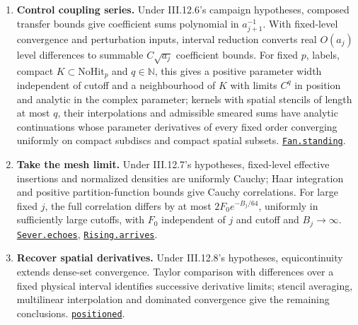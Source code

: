 \documentclass[
  letterpaper,
  11pt]{article}
\begin{document}
\begin{enumerate}
  place separated insertions in distinct cells with interior margins;
  offset comparison and the chessboard inequality bound products. Slot
  differences act on their insertions, giving III.12.1.
  \href{https://github.com/yang-mills-group/OpenAI-YM-20261028/blob/3456e5e75cf8d4cd558955a5c7638fba2d68f464/YM/FullVolume/Literal.lean\#L42-L61}{\texttt{funding}}.
\item
  \textbf{Control coupling series.} Under III.12.6's campaign
  hypotheses, composed transfer bounds give coefficient sums polynomial
  in \(a_{j+1}^{-1}\). With fixed-level convergence and perturbation
  inputs, interval reduction converts real \(O(a_j)\) level differences
  to summable \(C\sqrt{a_j}\) coefficient bounds. For fixed \(p\),
  labels, compact \(K\subset\mathrm{NoHit}_p\) and \(q\in\mathbb N\),
  this gives a positive parameter width independent of cutoff and a
  neighbourhood of \(K\) with limits \(C^q\) in position and analytic in
  the complex parameter; kernels with spatial stencils of length at most
  \(q\), their interpolations and admissible smeared sums have analytic
  continuations whose parameter derivatives of every fixed order
  converging uniformly on compact subdiscs and compact spatial subsets.
  \href{https://github.com/yang-mills-group/OpenAI-YM-20261028/blob/3456e5e75cf8d4cd558955a5c7638fba2d68f464/YM/FullVolume/Finale/Atlas.lean\#L94-L104}{\texttt{Fan.standing}}.
\item
  \textbf{Take the mesh limit.} Under III.12.7's hypotheses, fixed-level
  effective insertions and normalized densities are uniformly Cauchy;
  Haar integration and positive partition-function bounds give Cauchy
  correlations. For large fixed \(j\), the full correlation differs by
  at most \(2F_0e^{-B_j/64}\), uniformly in sufficiently large cutoffs,
  with \(F_0\) independent of \(j\) and cutoff and \(B_j\to\infty\).
  \href{https://github.com/yang-mills-group/OpenAI-YM-20261028/blob/3456e5e75cf8d4cd558955a5c7638fba2d68f464/YM/FullVolume/Fields/Peat.lean\#L41-L64}{\texttt{Sever.echoes}},
  \href{https://github.com/yang-mills-group/OpenAI-YM-20261028/blob/3456e5e75cf8d4cd558955a5c7638fba2d68f464/YM/FullVolume/Fields/Timber.lean\#L73-L103}{\texttt{Rising.arrives}}.
\item
  \textbf{Recover spatial derivatives.} Under III.12.8's hypotheses,
  equicontinuity extends dense-set convergence. Taylor comparison with
  differences over a fixed physical interval identifies successive
  derivative limits; stencil averaging, multilinear interpolation and
  dominated convergence give the remaining conclusions.
  \href{https://github.com/yang-mills-group/OpenAI-YM-20261028/blob/3456e5e75cf8d4cd558955a5c7638fba2d68f464/YM/FullVolume/Profiles.lean\#L42-L47}{\texttt{positioned}}.
\end{enumerate}
\end{document}

